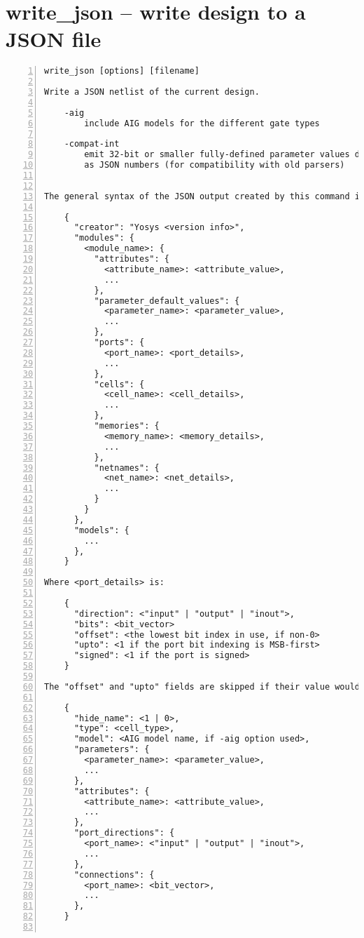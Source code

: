 \section{write\_json -- write design to a JSON file}
\label{cmd:write_json}
\begin{lstlisting}[numbers=left,frame=single]
    write_json [options] [filename]

Write a JSON netlist of the current design.

    -aig
        include AIG models for the different gate types

    -compat-int
        emit 32-bit or smaller fully-defined parameter values directly
        as JSON numbers (for compatibility with old parsers)


The general syntax of the JSON output created by this command is as follows:

    {
      "creator": "Yosys <version info>",
      "modules": {
        <module_name>: {
          "attributes": {
            <attribute_name>: <attribute_value>,
            ...
          },
          "parameter_default_values": {
            <parameter_name>: <parameter_value>,
            ...
          },
          "ports": {
            <port_name>: <port_details>,
            ...
          },
          "cells": {
            <cell_name>: <cell_details>,
            ...
          },
          "memories": {
            <memory_name>: <memory_details>,
            ...
          },
          "netnames": {
            <net_name>: <net_details>,
            ...
          }
        }
      },
      "models": {
        ...
      },
    }

Where <port_details> is:

    {
      "direction": <"input" | "output" | "inout">,
      "bits": <bit_vector>
      "offset": <the lowest bit index in use, if non-0>
      "upto": <1 if the port bit indexing is MSB-first>
      "signed": <1 if the port is signed>
    }

The "offset" and "upto" fields are skipped if their value would be 0.They don't affect connection semantics, and are only used to preserve originalHDL bit indexing.And <cell_details> is:

    {
      "hide_name": <1 | 0>,
      "type": <cell_type>,
      "model": <AIG model name, if -aig option used>,
      "parameters": {
        <parameter_name>: <parameter_value>,
        ...
      },
      "attributes": {
        <attribute_name>: <attribute_value>,
        ...
      },
      "port_directions": {
        <port_name>: <"input" | "output" | "inout">,
        ...
      },
      "connections": {
        <port_name>: <bit_vector>,
        ...
      },
    }


\end{lstlisting}
